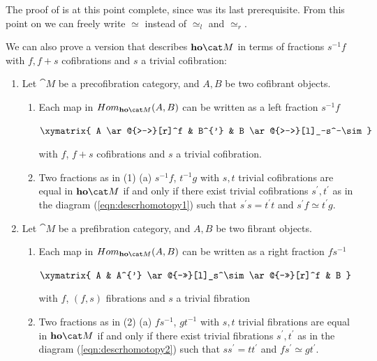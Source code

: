 The proof of  is at this point complete, since  was its last prerequisite. From this point on we can freely write $\simeq$ instead of $\simeq_l$ and $\simeq_r$.

We can also prove a version  that describes ${\bf ho}{\cat M}$ in terms of fractions $s^{-1}f$ with $f, f+s$ cofibrations and $s$ a trivial cofibration: 
\begin{thm}
\label{thm::descrhomotcof}
\mbox{}
\begin{enumerate}
\item
Let ${\cat M}$ be a precofibration category, and $A, B$ be two cofibrant objects.
\begin{enumerate}
\item
Each map in $Hom_{{\bf ho}{\cat M}} (A, B)$ can be written as a left fraction $s^{-1}f$
\begin{center}
$\xymatrix{ A \ar@{>->}[r]^f & B^{'} & B \ar@{>->}[l]_-s^-\sim
  }$
\end{center}
with $f$, $f+s$ cofibrations and $s$ a trivial cofibration.
\item
Two fractions as in  (1) (a) $s^{-1}f$, $t^{-1}g$ with $s, t$ trivial cofibrations are equal in ${\bf ho}{\cat M}$ if and only if there exist trivial cofibrations $s^{'}, t^{'}$ as in the diagram (\ref{eqn:descrhomotopy1}) such that $s^{'}s = t^{'}t$ and $s^{'}f \simeq t^{'}g$.
\end{enumerate}
\item
Let ${\cat M}$ be a prefibration category, and $A, B$ be two fibrant objects.
\begin{enumerate}
\item
Each map in $Hom_{{\bf ho}{\cat M}} (A, B)$ can be written as a right fraction $fs^{-1}$
\begin{center}
$\xymatrix{ A & A^{'} \ar@{->>}[l]_s^\sim \ar@{->>}[r]^f & B
  }$
\end{center}
with $f$, $(f, s)$ fibrations and $s$ a trivial fibration
\item
Two fractions as in  (2) (a) $fs^{-1}$, $gt^{-1}$ with $s, t$ trivial fibrations are equal in ${\bf ho}{\cat M}$ if and only if there exist trivial fibrations $s^{'}, t^{'}$ as in the diagram (\ref{eqn:descrhomotopy2}) such that $ss^{'} = tt^{'}$ and $fs^{'} \simeq gt^{'}$.
\end{enumerate}
\end{enumerate}
\end{thm}

